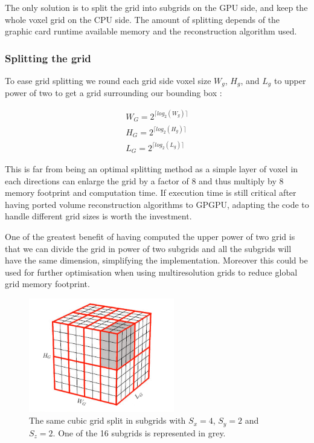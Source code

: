 \documentclass[12pt,journal,compsoc]{IEEEtran}
\begin{document}
The only solution is to split the grid into subgrids on the GPU side, and keep the whole voxel grid on the CPU side. The amount of splitting depends of the graphic card runtime available memory and the reconstruction algorithm used.

\subsubsection{Splitting the grid}
To ease grid splitting we round each grid side voxel size $W_g$, $H_g$, and $L_g$ to upper power of two to get a grid surrounding our bounding box :

\begin{eqnarray}
	W_G = 2^{\lceil log_2(W_g) \rceil}\\
	H_G = 2^{\lceil log_2(H_g) \rceil}\\
	L_G = 2^{\lceil log_2(L_g) \rceil}
\end{eqnarray}


This is far from being an optimal splitting method as a simple layer of voxel in each directions can enlarge the grid by a factor of 8 and thus multiply by 8 memory footprint and computation time. 
If execution time is still critical after having ported volume reconstruction algorithms to GPGPU, adapting the code to handle different grid sizes is worth the investment.

One of the greatest benefit of having computed the upper power of two grid is that we can divide the grid in power of two subgrids and all the subgrids will have the same dimension, simplifying the implementation. Moreover this could be used for further optimisation when using multiresolution grids to reduce global grid memory footprint. 

\begin{figure}[!ht]
\centering
\includegraphics[width=2.5in]{subgrid}
\caption{The same cubic grid split in subgrids with $S_x = 4$, $S_y=2$ and $S_z=2$. One of the 16 subgrids is represented in grey.}
\label{subgrids}
\end{figure}
\end{document}

